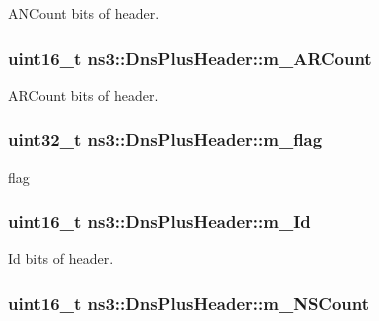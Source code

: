 A\-N\-Count bits of header. 

\hypertarget{classns3_1_1DnsPlusHeader_afe7adb4352d8f52c21a7c3f922314045}{
\subsubsection[{m\-\_\-\-A\-R\-Count}]{\setlength{\rightskip}{0pt plus 5cm}uint16\-\_\-t ns3\-::\-Dns\-Plus\-Header\-::m\-\_\-\-A\-R\-Count\hspace{0.3cm}{\ttfamily [private]}}}\label{classns3_1_1DnsPlusHeader_afe7adb4352d8f52c21a7c3f922314045}


A\-R\-Count bits of header. 

\hypertarget{classns3_1_1DnsPlusHeader_a2cb95f6912613452fc57847e15e4f7ac}{
\subsubsection[{m\-\_\-flag}]{\setlength{\rightskip}{0pt plus 5cm}uint32\-\_\-t ns3\-::\-Dns\-Plus\-Header\-::m\-\_\-flag\hspace{0.3cm}{\ttfamily [private]}}}\label{classns3_1_1DnsPlusHeader_a2cb95f6912613452fc57847e15e4f7ac}


flag 

\hypertarget{classns3_1_1DnsPlusHeader_a5c9375cfe16fc339e52d0ae1b9c19a24}{
\subsubsection[{m\-\_\-\-Id}]{\setlength{\rightskip}{0pt plus 5cm}uint16\-\_\-t ns3\-::\-Dns\-Plus\-Header\-::m\-\_\-\-Id\hspace{0.3cm}{\ttfamily [private]}}}\label{classns3_1_1DnsPlusHeader_a5c9375cfe16fc339e52d0ae1b9c19a24}


Id bits of header. 

\hypertarget{classns3_1_1DnsPlusHeader_ace416d666df5fe25acfbfdd7aad309ce}{
\subsubsection[{m\-\_\-\-N\-S\-Count}]{\setlength{\rightskip}{0pt plus 5cm}uint16\-\_\-t ns3\-::\-Dns\-Plus\-Header\-::m\-\_\-\-N\-S\-Count\hspace{0.3cm}{\ttfamily [private]}}}\label{classns3_1_1DnsPlusHeader_ace416d666df5fe25acfbfdd7aad309ce}


